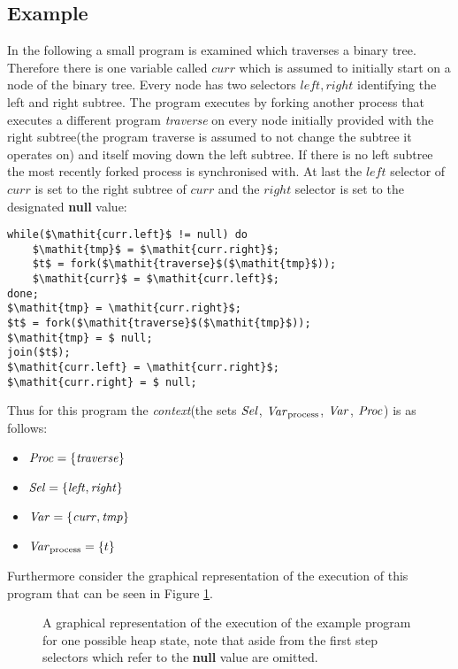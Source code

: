 	\subsection{Example}
	In the following a small program is examined which traverses a binary tree.
	Therefore there is one variable called $\mathit{curr}$ which is assumed to
	initially start on a node of the binary tree. Every node has two selectors
	$\mathit{left},\mathit{right}$ identifying the left and right subtree. The
	program executes by forking another process that executes a
	different program \emph{traverse} on every node initially
	provided with the right subtree(the program traverse is assumed to not
	change the subtree it operates on) and itself moving down the left subtree.
	If there is no left subtree the most recently forked process is synchronised
	with. At last the $\mathit{left}$ selector of $\mathit{curr}$ is set to the
	right subtree of $\mathit{curr}$ and the $\mathit{right}$ selector is set to
	the designated \textbf{null} value:
	\begin{lstlisting}[caption={An example program}, label={lst:ExampleProgram}]
while($\mathit{curr.left}$ != null) do
	$\mathit{tmp}$ = $\mathit{curr.right}$;
	$t$ = fork($\mathit{traverse}$($\mathit{tmp}$));
	$\mathit{curr}$ = $\mathit{curr.left}$;
done;
$\mathit{tmp} = \mathit{curr.right}$;
$t$ = fork($\mathit{traverse}$($\mathit{tmp}$));
$\mathit{tmp} = $ null;
join($t$);
$\mathit{curr.left} = \mathit{curr.right}$;
$\mathit{curr.right} = $ null;
	\end{lstlisting}
	Thus for this program the \emph{context}(the sets $\mathit{Sel}$, $\mathit{Var}_{\text{process}}$, $\mathit{Var}$,
	$\mathit{Proc}$) is as follows:
	\begin{itemize}
		\item $\mathit{Proc} = \{ \mathit{traverse} \}$
		\item $\mathit{Sel}  = \{ \mathit{left}, \mathit{right} \}$
		\item $\mathit{Var}  = \{ \mathit{curr}, \mathit{tmp}   \}$
		\item $\mathit{Var}_{\text{process}}   = \{ t \}$
	\end{itemize}
	Furthermore consider the graphical representation of the execution of this 
	program that can be seen in Figure \ref{fig:BinTreeProgLang}.
	\begin{figure}
		
		\caption{A graphical representation of the execution of the example
		program for one possible heap state, note that aside from the first step
		selectors which refer to the \textbf{null} value are omitted.}
		\label{fig:BinTreeProgLang}
	\end{figure}
